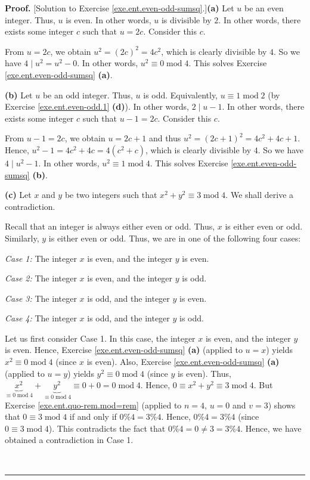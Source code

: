 \documentclass[numbers=enddot,12pt,final,onecolumn,notitlepage]{scrartcl}%
\numberwithin{exer}{subsection}
\theoremstyle{definition}
\newenvironment{fineprint}{\begin{small}}{\end{small}}
\newenvironment{proof}[1][Proof]{\noindent\textbf{#1.} }{\ \rule{0.5em}{0.5em}}
\begin{document}
\begin{fineprint}
\begin{proof}
[Solution to Exercise \ref{exe.ent.even-odd-sumsq}.]\textbf{(a)} Let $u$ be an
even integer. Thus, $u$ is even. In other words, $u$ is divisible by $2$. In
other words, there exists some integer $c$ such that $u=2c$. Consider this $c$.

From $u=2c$, we obtain $u^{2}=\left(  2c\right)  ^{2}=4c^{2}$, which is
clearly divisible by $4$. So we have $4\mid u^{2}=u^{2}-0$. In other words,
$u^{2}\equiv0\operatorname{mod}4$. This solves Exercise
\ref{exe.ent.even-odd-sumsq} \textbf{(a)}.

\textbf{(b)} Let $u$ be an odd integer. Thus, $u$ is odd. Equivalently,
$u\equiv1\operatorname{mod}2$ (by Exercise \ref{exe.ent.even-odd.1}
\textbf{(d)}). In other words, $2\mid u-1$. In other words, there exists some
integer $c$ such that $u-1=2c$. Consider this $c$.

From $u-1=2c$, we obtain $u=2c+1$ and thus $u^{2}=\left(  2c+1\right)
^{2}=4c^{2}+4c+1$. Hence, $u^{2}-1=4c^{2}+4c=4\left(  c^{2}+c\right)  $, which
is clearly divisible by $4$. So we have $4\mid u^{2}-1$. In other words,
$u^{2}\equiv1\operatorname{mod}4$. This solves Exercise
\ref{exe.ent.even-odd-sumsq} \textbf{(b)}.

\textbf{(c)} Let $x$ and $y$ be two integers such that $x^{2}+y^{2}%
\equiv3\operatorname{mod}4$. We shall derive a contradiction.

Recall that an integer is always either even or odd. Thus, $x$ is either even
or odd. Similarly, $y$ is either even or odd. Thus, we are in one of the
following four cases:

\textit{Case 1:} The integer $x$ is even, and the integer $y$ is even.

\textit{Case 2:} The integer $x$ is even, and the integer $y$ is odd.

\textit{Case 3:} The integer $x$ is odd, and the integer $y$ is even.

\textit{Case 4:} The integer $x$ is odd, and the integer $y$ is odd.

Let us first consider Case 1. In this case, the integer $x$ is even, and the
integer $y$ is even. Hence, Exercise \ref{exe.ent.even-odd-sumsq} \textbf{(a)}
(applied to $u=x$) yields $x^{2}\equiv0\operatorname{mod}4$ (since $x$ is
even). Also, Exercise \ref{exe.ent.even-odd-sumsq} \textbf{(a)} (applied to
$u=y$) yields $y^{2}\equiv0\operatorname{mod}4$ (since $y$ is even). Thus,
$\underbrace{x^{2}}_{\equiv0\operatorname{mod}4}+\underbrace{y^{2}}%
_{\equiv0\operatorname{mod}4}\equiv0+0=0\operatorname{mod}4$. Hence, $0\equiv
x^{2}+y^{2}\equiv3\operatorname{mod}4$. But Exercise
\ref{exe.ent.quo-rem.mod=rem} (applied to $n=4$, $u=0$ and $v=3$) shows that
$0\equiv3\operatorname{mod}4$ if and only if $0\%4=3\%4$. Hence, $0\%4=3\%4$
(since $0\equiv3\operatorname{mod}4$). This contradicts the fact that
$0\%4=0\neq3=3\%4$. Hence, we have obtained a contradiction in Case 1.


\end{proof}
\end{fineprint}
\end{document}
